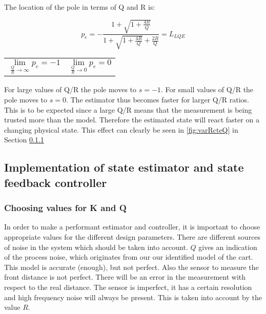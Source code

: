 \documentclass[a4paper]{article}
\newcommand{\newpar}{\vspace{.3cm}\noindent}
\begin{document}
\newpar
The location of the pole in terms of Q and R is:

\begin{equation}
    p_{e} = -\frac{1+\sqrt{1+\frac{4R}{Q}}}{1+\sqrt{1+\frac{4R}{Q}}+\frac{2R}{Q}} = L_{LQE}
    \label{eq:LQEstab}
\end{equation}

\begin{center}
    \begin{tabular}{p{5cm}p{5cm}}
        \begin{equation}
            \lim_{\frac{Q}{R}\to\infty} p_{e} = -1      \label{eq:perhoinf}
        \end{equation}
        &  
        \begin{equation}
            \lim_{\frac{Q}{R}\to0} p_{e} = 0 
            \label{eq:perho0}
        \end{equation}
        
    \end{tabular}
\end{center}

\newpar
For large values of Q/R the pole moves to \( s = -1\). For small values of Q/R the pole moves to \( s = 0\). The estimator thus becomes faster for larger Q/R ratios. This is to be expected since a large Q/R means that the measurement is being trusted more than the model. Therefore the estimated state will react faster on a changing physical state. This effect can clearly be seen in \autoref{fig:varRcteQ} in Section \ref{} 

\subsection{Implementation of state estimator and state feedback controller}
\subsubsection{Choosing values for K and Q}

In order to make a performant estimator and controller, it is important to choose appropriate values for the different design parameters. There are different sources of noise in the system which should be taken into account. $Q$ gives an indication of the process noise, which originates from our our identified model of the cart. This model is accurate (enough), but not perfect. Also the sensor to measure the front distance is not perfect. There will be an error in the measurement with respect to the real distance. The sensor is imperfect, it has a certain resolution and high frequency noise will always be present. This is taken into account by the value $R$. 
\end{document}
